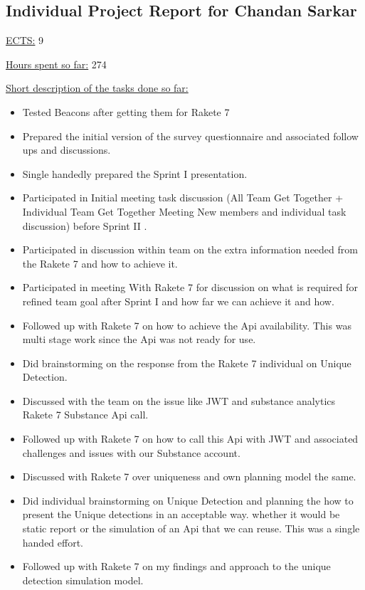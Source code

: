 \subsection{Individual Project Report for Chandan Sarkar}
\par \underline{ECTS:} 9
\par \underline{Hours spent so far:} 274
\par \underline{Short description of the tasks done so far:}
\begin{itemize}
	\item Tested Beacons after getting them for Rakete 7
	\item Prepared the initial version of the survey questionnaire and associated follow ups and discussions.
	\item Single handedly prepared the Sprint I presentation.
	\item Participated in Initial meeting task discussion (All Team Get Together  + Individual Team Get Together Meeting New members and individual task discussion) before Sprint II .
	\item Participated in discussion within team on the extra information needed from the Rakete 7 and how to achieve it.
	\item Participated in meeting With Rakete 7 for discussion on what is required for refined team goal after Sprint I and how far we can achieve it and how.
	\item Followed up with Rakete 7 on how to achieve the Api availability. This was multi stage work since the Api was not ready for use.
	\item Did brainstorming on the response from the Rakete 7 individual on Unique Detection.
	\item Discussed with the team on the issue like JWT and substance analytics Rakete 7 Substance Api call.
	\item Followed up with Rakete 7 on how to call this Api with JWT and associated challenges and issues with our Substance account.
	\item Discussed with Rakete 7 over uniqueness and own planning model the same.
	\item Did individual brainstorming on Unique Detection and planning the how to present the Unique detections in an acceptable way. whether it would be static report or the simulation of an Api that we can reuse. This was a single handed effort.
	\item Followed up with Rakete 7 on my findings and approach to the unique detection simulation model.

\end{itemize}
